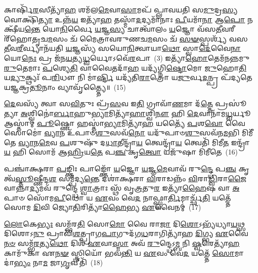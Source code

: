 𑌕𑌾𑌰𑍍\mbox{}𑌷𑌿᳴\-\ul{𑌰}\-𑌸𑍀𑌤𑍍𑌯𑌾᳴\-\ul{𑌹} 𑌶𑌮᳴𑌲\-\ul{𑌮𑍇}\-𑌵𑌾\-\ul{𑌸𑌾}\-𑌮𑌪᳴ 𑌪𑍍𑌲𑌾𑌵𑌯𑌤𑌿 𑌸\-\ul{𑌮𑍁}\-𑌦𑍍𑌰\-\ul{𑌸𑍍𑌯} 𑌵𑍋𑌕𑍍𑌷𑌿᳴\-\ul{𑌤𑍍𑌯𑌾} 𑌉𑌨𑍍𑌨᳴\-\ul{𑌯} 𑌇𑌤𑍍𑌯𑌾᳴\-\ul{𑌹} 𑌤𑌸𑍍𑌮𑌾᳴\-\ul{𑌦}\-𑌦𑍍𑌯𑌮𑌾᳴𑌨𑌾𑌃 \ul{𑌪𑍀}\-𑌯𑌮𑌾᳴\-\ul{𑌨𑌾} 𑌆\-\ul{𑌪𑍋} 𑌨 𑌕𑍍𑌷𑍀᳴𑌯\-\ul{𑌨𑍍𑌤𑍇} 𑌯𑍋\-\ul{𑌨𑌿}\-𑌰𑍍𑌵𑍈 \ul{𑌯}\-𑌜𑍍𑌞\-\ul{𑌸𑍍𑌯} 𑌚𑌾𑌤𑍍𑌵𑌾᳴𑌲𑌂 \ul{𑌯}\-𑌜𑍍𑌞𑍋 𑌵᳴𑌸\-\ul{𑌤𑍀}\-𑌵𑌰𑍀𑌰𑍍\mbox{}᳴𑌹𑍋𑌤𑍃𑌚\-\ul{𑌮}\-𑌸𑌂 𑌚᳴ 𑌮𑍈𑌤𑍍𑌰𑌾𑌵𑌰𑍁𑌣𑌚\-\ul{𑌮}\-𑌸𑌂 𑌚᳴ \ul{𑌸}\-\-\ul{𑍟}\-𑌸𑍍𑌪𑌰𑍍𑌶𑍍𑌯᳴ 𑌵𑌸\-\ul{𑌤𑍀}\-𑌵\-\ul{𑌰𑍀}\-𑌰𑍍𑌵𑍍𑌯𑌾𑌨᳴𑌯𑌤𑌿 \ul{𑌯}\-𑌜𑍍𑌞𑌸𑍍𑌯᳴ 𑌸𑌯𑍋\-\ul{𑌨𑌿}\-𑌤𑍍𑌵𑌾𑌯𑌾\-\ul{𑌥𑍋} 𑌸𑍍𑌵𑌾\-\ul{𑌦𑍇}\-𑌵𑍈\-\ul{𑌨𑌾} 𑌯𑍋\-\ul{𑌨𑍇𑌃} 𑌪𑍍𑌰 𑌜᳴𑌨\-\ul{𑌯}\-𑌤𑍍𑌯\-\ul{𑌧𑍍𑌵}\-𑌰𑍍𑌯𑍋\-𑌽𑌵𑍇᳴\-\ul{𑌰}\-𑌪𑌾~(3) 𑌇𑌤𑍍𑌯𑌾᳴\-\ul{𑌹𑍋}\-𑌤𑍇𑌮᳴𑌨𑌨𑍍𑌨𑌮𑍁\-\ul{𑌰𑍁}\-𑌤𑍇𑌮𑌾𑌃 \ul{𑌪}\-𑌶𑍍𑌯𑍇\-\ul{𑌤𑌿} 𑌵𑌾𑌵𑍈𑌤𑌦𑌾᳴\-\ul{𑌹} 𑌯𑌦𑍍𑌯᳴𑌗𑍍𑌨𑌿\-\ul{𑌷𑍍𑌟𑍋}\-𑌮𑍋 \ul{𑌜𑍁}\-𑌹𑍋\-\ul{𑌤𑌿} 𑌯\-\ul{𑌦𑍍𑌯𑍁}\-𑌕𑍍𑌥𑍍𑌯𑌃᳴ 𑌪\-\ul{𑌰𑌿}\-𑌧𑍗 𑌨𑌿 𑌮𑌾॑\-\ul{𑌰𑍍𑌷𑍍𑌟𑌿} 𑌯𑌦𑍍𑌯᳴𑌤𑌿\-\ul{𑌰𑌾}\-𑌤𑍍𑌰𑍋 𑌯\-\ul{𑌜𑍁}\-𑌰𑍍𑌵\-\ul{𑌦}\-𑌨𑍍𑌪𑍍𑌰 𑌪᳴𑌦𑍍𑌯𑌤𑍇 𑌯𑌜𑍍𑌞𑌕𑍍𑌰\-\ul{𑌤𑍂}\-𑌨𑌾𑌂 𑌵𑍍𑌯𑌾𑌵𑍃᳴𑌤𑍍𑌤𑍍𑌯𑍈॥~(15)

{\anuvakamend[{\-\ul{𑌵𑌾}\-𑌚𑍋 𑌹𑌵᳴\-\ul{𑌮}\-𑌭𑌿𑌘𑍃᳴𑌤𑌾𑌨𑌾𑌂 𑌗𑍃𑌹𑍍𑌣𑌾\-\ul{𑌤𑍍𑌯𑍁}\-𑌤 𑌪𑌞𑍍𑌚᳴𑌵𑌿𑍞𑌶𑌤𑌿𑌶𑍍𑌚}]}%

\-\ul{𑌦𑍇}\-𑌵𑌸𑍍𑌯᳴ 𑌤𑍍𑌵𑌾 𑌸\-\ul{𑌵𑌿}\-𑌤𑍁𑌃 𑌪𑍍𑌰᳴\-\ul{𑌸}\-𑌵 𑌇\-\ul{𑌤𑌿} 𑌗𑍍𑌰𑌾𑌵𑌾᳴\-\ul{𑌣}\-𑌮𑌾 𑌦᳴\-\ul{𑌤𑍍𑌤𑍇} 𑌪𑍍𑌰𑌸𑍂॑𑌤𑍍𑌯𑌾 \ul{𑌅}\-𑌶𑍍𑌵𑌿𑌨𑍋॑\-\ul{𑌰𑍍𑌬𑌾}\-𑌹𑍁\-\ul{𑌭𑍍𑌯𑌾}\-𑌮𑌿𑌤𑍍𑌯𑌾᳴\-\ul{𑌹𑌾}\-𑌶𑍍𑌵𑌿\-\ul{𑌨𑍗} 𑌹𑌿 \ul{𑌦𑍇}\-𑌵𑌾𑌨𑌾᳴𑌮\-\ul{𑌧𑍍𑌵}\-𑌰𑍍𑌯𑍂 𑌆𑌸𑍍𑌤𑌾॑𑌮𑍍 \ul{𑌪𑍂}\-𑌷𑍍𑌣𑍋 𑌹𑌸𑍍𑌤𑌾॑\-\ul{𑌭𑍍𑌯𑌾}\-𑌮𑌿𑌤𑍍𑌯𑌾᳴\-\ul{𑌹} 𑌯𑌤𑍍𑌯𑍈᳴ \ul{𑌪}\-𑌶\-\ul{𑌵𑍋} 𑌵𑍈 𑌸𑍋𑌮𑍋॑ \ul{𑌵𑍍𑌯𑌾}\-𑌨 𑌉᳴𑌪𑌾𑍞\-\ul{𑌶𑍁}\-𑌸𑌵᳴\-\ul{𑌨𑍋} 𑌯𑌦𑍁᳴𑌪𑌾𑍞\-\ul{𑌶𑍁}\-𑌸𑌵᳴𑌨\-\ul{𑌮}\-𑌭𑌿 𑌮𑌿𑌮𑍀᳴𑌤𑍇 \ul{𑌵𑍍𑌯𑌾}\-𑌨\-\ul{𑌮𑍇}\-𑌵 \ul{𑌪}\-𑌶𑍁𑌷𑍁᳴ 𑌦\-\ul{𑌧𑌾}\-𑌤𑍀𑌨𑍍𑌦𑍍𑌰𑌾᳴\-\ul{𑌯} 𑌤𑍍𑌵𑍇𑌨𑍍𑌦𑍍𑌰𑌾᳴\-\ul{𑌯} 𑌤𑍍𑌵𑍇𑌤𑌿᳴ 𑌮𑌿𑌮𑍀\-\ul{𑌤} 𑌇𑌨𑍍𑌦𑍍𑌰𑌾᳴\-\ul{𑌯} 𑌹𑌿 𑌸𑍋𑌮᳴ 𑌆\-\ul{𑌹𑍍𑌰𑌿}\-𑌯\-\ul{𑌤𑍇} 𑌪\-\ul{𑌞𑍍𑌚} 𑌕𑍃\-\ul{𑌤𑍍𑌵𑍋} 𑌯𑌜𑍁᳴𑌷𑌾 𑌮𑌿𑌮𑍀𑌤𑍇~(16)

𑌪𑌞𑍍𑌚𑌾॑𑌕𑍍𑌷𑌰𑌾 \ul{𑌪}\-𑌙𑍍𑌕𑍍𑌤𑌿𑌃 𑌪𑌾𑌙𑍍𑌕𑍍𑌤𑍋᳴ \ul{𑌯}\-𑌜𑍍𑌞𑍋 \ul{𑌯}\-𑌜𑍍𑌞\-\ul{𑌮𑍇}\-𑌵𑌾𑌵᳴ 𑌰𑍁\-\ul{𑌨𑍍𑌦𑍍𑌧𑍇} 𑌪\-\ul{𑌞𑍍𑌚} 𑌕𑍃𑌤𑍍𑌵᳴\-\ul{𑌸𑍍𑌤𑍂}\-𑌷𑍍𑌣𑍀𑌨𑍍𑌦\-\ul{𑌶} 𑌸𑌮𑍍𑌪᳴𑌦𑍍𑌯\-\ul{𑌨𑍍𑌤𑍇} 𑌦𑌶𑌾॑𑌕𑍍𑌷𑌰𑌾 \ul{𑌵𑌿}\-𑌰𑌾𑌡𑌨𑍍𑌨𑌂᳴ \ul{𑌵𑌿}\-𑌰𑌾\-\ul{𑌡𑍍𑌵𑌿}\-𑌰𑌾\-\ul{𑌜𑍈}\-𑌵𑌾𑌨𑍍𑌨𑌾\-\ul{𑌦𑍍𑌯}\-𑌮𑌵᳴ 𑌰𑍁𑌨𑍍𑌦𑍍𑌧𑍇 \ul{𑌶𑍍𑌵𑌾}\-𑌤𑍍𑌰𑌾𑌃 𑌸𑍍𑌥᳴ 𑌵𑍃\-\ul{𑌤𑍍𑌰}\-𑌤𑍁\-\ul{𑌰} 𑌇𑌤𑍍𑌯𑌾᳴\-\ul{𑌹𑍈}\-𑌷 𑌵𑌾 \ul{𑌅}\-𑌪𑌾𑍞 𑌸𑍋᳴𑌮\-\ul{𑌪𑍀}\-𑌥𑍋 𑌯 \ul{𑌏}\-𑌵𑌂 𑌵𑍇\-\ul{𑌦} 𑌨𑌾𑌫𑍍𑌸𑍍𑌵𑌾\-\ul{𑌰𑍍𑌤𑌿}\-𑌮𑌾𑌰𑍍𑌚𑍍𑌛᳴\-\ul{𑌤𑌿} 𑌯𑌤𑍍𑌤𑍇᳴ 𑌸𑍋𑌮 \ul{𑌦𑌿}\-𑌵𑌿 𑌜𑍍𑌯𑍋\-\ul{𑌤𑌿}\-𑌰𑌿𑌤𑍍𑌯𑌾᳴\-\ul{𑌹𑍈}\-𑌭𑍍𑌯 \ul{𑌏}\-𑌵𑍈𑌨𑌮𑍍॑~(17)

\-\ul{𑌲𑍋}\-𑌕𑍇\-\ul{𑌭𑍍𑌯𑌃} 𑌸𑌮𑍍𑌭᳴𑌰\-\ul{𑌤𑌿} 𑌸𑍋\-\ul{𑌮𑍋} 𑌵𑍈 𑌰𑌾\-\ul{𑌜𑌾} 𑌦𑌿\-\ul{𑌶𑍋}\-\-𑌽𑌭𑍍𑌯᳴𑌧𑍍𑌯𑌾\-\ul{𑌯}\-𑌥𑍍𑌸 𑌦𑌿𑌶𑍋\-𑌽\-\ul{𑌨𑍁} 𑌪𑍍𑌰𑌾𑌵𑌿᳴\-\ul{𑌶}\-𑌤𑍍𑌪𑍍𑌰𑌾𑌗\-\ul{𑌪𑌾}\-𑌗𑍁𑌦᳴𑌗\-\ul{𑌧}\-𑌰𑌾𑌗𑌿𑌤𑍍𑌯𑌾᳴𑌹 \ul{𑌦𑌿}\-𑌗𑍍𑌭𑍍𑌯 \ul{𑌏}\-𑌵𑍈\-\ul{𑌨}\-\-\ul{𑍞} 𑌸𑌮𑍍𑌭᳴\-\ul{𑌰}\-𑌤𑍍𑌯\-\ul{𑌥𑍋} 𑌦𑌿𑌶᳴ \ul{𑌏}\-𑌵𑌾\-\ul{𑌸𑍍𑌮𑌾} 𑌅𑌵᳴ \ul{𑌰𑍁}\-𑌨𑍍𑌦𑍍𑌧𑍇\-𑌽\-\ul{𑌮𑍍𑌬} 𑌨𑌿 \ul{𑌷𑍍𑌵}\-𑌰𑍇𑌤𑍍𑌯𑌾᳴\-\ul{𑌹} 𑌕𑌾𑌮𑍁᳴𑌕𑌾 𑌏\-\ul{𑌨}\-\-\ul{𑍟} 𑌸𑍍𑌤𑍍𑌰𑌿𑌯𑍋᳴ 𑌭𑌵\-\ul{𑌨𑍍𑌤𑌿} 𑌯 \ul{𑌏}\-𑌵𑌂 𑌵𑍇\-\ul{𑌦} 𑌯𑌤𑍍𑌤𑍇᳴ \ul{𑌸𑍋}\-𑌮𑌾𑌦𑌾॑\-\ul{𑌭𑍍𑌯𑌂} 𑌨𑌾\-\ul{𑌮} 𑌜𑌾\-\ul{𑌗𑍃}\-𑌵𑍀𑌤𑌿᳴~(18)

